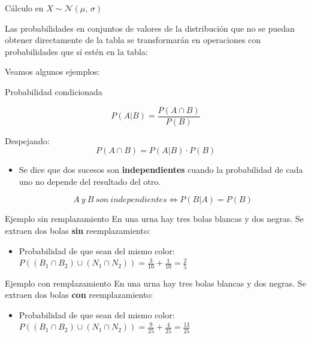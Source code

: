\documentclass[11pt,handout]{beamer}
\begin{document}
\begin{frame}{Cálculo en $X \sim \mathcal{N}(\mu,\,\sigma)$} 
\begin{block}
    Las probabilidades en conjuntos de valores de la distribución que no se puedan obtener directamente de la tabla se transformarán en operaciones con probabilidades que sí estén en la tabla:
\end{block}
Veamos algunos ejemplos:
\end{frame}


\begin{frame}{Probabilidad condicionada}
\begin{block}{}
$$P(A|B)=\dfrac{P(A\cap B)}{P(B)}$$
\end{block}
Despejando:
$$P(A\cap B) = P(A|B)\cdot P(B)$$

\begin{itemize}[<+->]
\item Se dice que dos sucesos son \textbf{independientes} cuando la probabilidad de cada uno no depende del resultado del otro. 

$$A\ y \ B\ son \ independientes \Longleftrightarrow P(B|A)=P(B)$$

\end{itemize}
\end{frame}

\begin{frame}{Ejemplo sin remplazamiento}
En una urna hay tres bolas blancas y dos negras. Se extraen dos bolas \textbf{sin} reemplazamiento:

\begin{itemize}[<+->]
\item Probabilidad de que sean del mismo color: \\
$P((B_1\cap B_2)\cup (N_1\cap N_2))=\frac{3}{10}+\frac{1}{10}=\frac{2}{5}$
\end{itemize}

\end{frame}

\begin{frame}{Ejemplo con remplazamiento}
En una urna hay tres bolas blancas y dos negras. Se extraen dos bolas \textbf{con} reemplazamiento:

\begin{itemize}
\item Probabilidad de que sean del mismo color: \\
$P((B_1\cap B_2)\cup (N_1\cap N_2))=\frac{9}{25}+\frac{4}{25}=\frac{13}{25}$
\end{itemize}

\end{frame}
\end{document}
